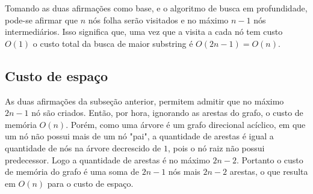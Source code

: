 Tomando as duas afirmações como base, e o algoritmo de busca em profundidade,
pode-se afirmar que $n$ nós folha serão visitados e no máximo $n-1$ nós
intermediários.
Isso significa que, uma vez que a visita a cada nó tem custo $O(1)$ o custo total
da busca de maior substring é $O(2n-1) = O(n)$.

\subsection{Custo de espaço}

As duas afirmações da subseção anterior, permitem admitir que no máximo $2n-1$
nó são criados.
Então, por hora, ignorando as arestas do grafo, o custo de memória $O(n)$.
Porém, como uma árvore é um grafo direcional acíclico, em que um nó não possui
mais de um nó "pai", a quantidade de arestas é igual a quantidade de nós na árvore
decrescido de $1$, pois o nó raiz não possui predecessor.
Logo a quantidade de arestas é no máximo $2n-2$.
Portanto o custo de memória do grafo é uma soma de $2n-1$ nós mais $2n-2$ arestas,
o que resulta em $O(n)$ para o custo de espaço.
